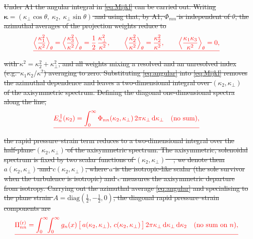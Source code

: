 \documentclass[lineno]{JFM-FLM_Au}
\providecommand{\DIFdel}[1]{{\protect\color{red}\sout{#1}}}                      %
\begin{document}
\DIFdel{Under A1 the angular integral in \eqref{eq:Mijkl} can be carried out. Writing
$\boldsymbol{\kappa}=(\kappa_\perp\cos\theta,\ \kappa_2,\
\kappa_\perp\sin\theta)$ and using that, by A1, $\Phi_{mn}$ is independent of
$\theta$, the azimuthal averages of the projection weights reduce to
}\begin{displaymath}
  \DIFdel{\Bigl\langle \frac{\kappa_1^2}{\kappa^2}\Bigr\rangle_\theta
  = \Bigl\langle \frac{\kappa_3^2}{\kappa^2}\Bigr\rangle_\theta
  = \frac{1}{2}\,\frac{\kappa_\perp^2}{\kappa^2},
  \qquad
  \Bigl\langle \frac{\kappa_2^2}{\kappa^2}\Bigr\rangle_\theta
  = \frac{\kappa_2^2}{\kappa^2},
  \qquad
  \Bigl\langle \frac{\kappa_1\kappa_3}{\kappa^2}\Bigr\rangle_\theta = 0,
}\end{displaymath}%
\DIFdel{with $\kappa^2=\kappa_2^2+\kappa_\perp^2$, and all weights mixing a resolved
and an unresolved index (e.g.\ $\kappa_1\kappa_2/\kappa^2$) averaging to zero.
Substituting \eqref{eq:angular} into \eqref{eq:Mijkl} removes the azimuthal
dependence and leaves a two-dimensional integral over $(\kappa_2,\kappa_\perp)$
of the axisymmetric spectrum. Defining the diagonal one-dimensional spectra
along the line,
}\begin{displaymath}
  \DIFdel{E_n^{\,\|}(\kappa_2)
   = \int_0^\infty \Phi_{nn}(\kappa_2,\kappa_\perp)\,
     2\pi\kappa_\perp\,\mathrm{d}\kappa_\perp
   \quad(\text{no sum}),
}\end{displaymath}%
\DIFdel{the rapid pressure--strain term reduces to a two-dimensional integral over the
half-plane $(\kappa_2,\kappa_\perp)$ of the axisymmetric spectrum. The
axisymmetric, solenoidal spectrum is fixed by two scalar functions of
$(\kappa_2,\kappa_\perp)$ \mbox{%
\citep{Batchelor1946,ChandrasekharAxisym1950}}\hskip0pt%
; we
denote them $a(\kappa_2,\kappa_\perp)$ and $c(\kappa_2,\kappa_\perp)$, where
$a$ is the isotropic-like scalar (the sole survivor when the turbulence is
isotropic) and $c$ measures the axisymmetric departure from isotropy. Carrying
out the azimuthal average \eqref{eq:angular} and specialising to the plane
strain $A=\mathrm{diag}(\tfrac12,-\tfrac12,0)$, the diagonal rapid
pressure--strain components are
}\begin{displaymath}
  \DIFdel{\Pi^{(\mathrm r)}_{nn}
  = \int_{0}^{\infty}\!\!\int_{0}^{\infty}
      g_{n}(x)\,\bigl[\,a(\kappa_2,\kappa_\perp),\,c(\kappa_2,\kappa_\perp)\,\bigr]\,
      2\pi\kappa_\perp\,\mathrm{d}\kappa_\perp\,\mathrm{d}\kappa_2
   \quad(\text{no sum on }n),
}\end{displaymath}%
\end{document}

